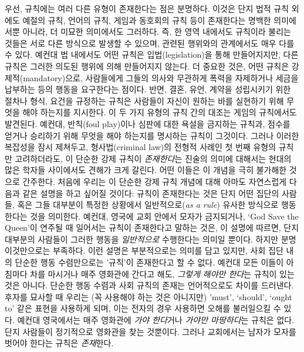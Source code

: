 \documentclass[12pt, oneside]{book}  %
\begin{document}
우선, 규칙에는 여러 다른 유형이 존재한다는 점은 분명하다. 이것은 단지
법적 규칙 외에도 예절의 규칙, 언어의 규칙, 게임과 동호회의 규칙 등이
존재한다는 명백한 의미에서뿐 아니라, 더 미묘한 의미에서도 그러하다. 즉,
한 영역 내에서도 규칙이라 불리는 것들은 서로 다른 방식으로 발생할 수
있으며, 관련된 행위와의 관계에서도 매우 다를 수 있다. 예컨대 법 내에서도
어떤 규칙은 입법(legislation)을 통해 만들어지지만, 다른 규칙은 그러한
의도된 행위에 의해 만들어지지 않는다. 더 중요한 것은, 어떤 규칙은
강제적(mandatory)으로, 사람들에게 그들의 의사와 무관하게 폭력을
자제하거나 세금을 납부하는 등의 행동을 요구한다는 점이다. 반면, 결혼,
유언, 계약을 성립시키기 위한 절차나 형식, 요건을 규정하는 규칙은
사람들이 자신이 원하는 바를 실현하기 위해 무엇을 해야 하는지를 지시한다.
이 두 가지 유형의 규칙 간의 대조는 게임의 규칙에서도 발견된다. 예컨대,
반칙(foul play)이나 심판에 대한 욕설을 금지하는 규칙과, 점수를 얻거나
승리하기 위해 무엇을 해야 하는지를 명시하는 규칙이 그것이다. 그러나
이러한 복잡성을 잠시 제쳐두고, 형사법(criminal law)의 전형적 사례인 첫
번째 유형의 규칙만 고려하더라도, 이 단순한 강제 규칙이 \emph{존재한다}는
진술의 의미에 대해서는 현대의 많은 학자들 사이에서도 견해가 크게 갈린다.
어떤 이들은 이 개념을 극히 불가해한 것으로 간주한다. 처음에 우리는 이
단순한 강제 규칙 개념에 대해 아마도 자연스럽게 다음과 같은 설명을 하고
싶어질 것이다: 규칙이 존재한다는 것은 단지 어떤 집단의 사람들, 혹은 그들
대부분이 특정한 상황에서 일반적으로(\emph{as a rule}) 유사한 방식으로
행동한다는 것을 의미한다. 예컨대, 영국에 교회 안에서 모자가 금지되거나,
`God Save the Queen'이 연주될 때 일어서는 규칙이 존재한다고 말하는 것은,
이 설명에 따르면, 단지 대부분의 사람들이 그러한 행동을 \emph{일반적으로}
수행한다는 의미일 뿐이다. 하지만 분명 이것만으로는 부족하다. 이런 설명은
부분적으로는 의미를 담고 있지만, 사회 집단 내의 단순한 행동 수렴만으로는
'규칙'이 존재한다고 할 수 없다. 예컨대 모든 이들이 아침마다 차를
마시거나 매주 영화관에 간다고 해도, \emph{그렇게 해야만 한다}는 규칙이
있는 것은 아니다. 단순한 행동 수렴과 사회 규칙의 존재는 언어적으로도
차이를 드러낸다. 후자를 묘사할 때 우리는 (꼭 사용해야 하는 것은
아니지만) 'must', `should', `ought to' 같은 표현을 사용하게 되며, 이는
전자의 경우 사용하면 오해를 불러일으킬 수 있다. 예컨대 영국에서는 매주
영화관에 \emph{가야 한다}거나 \emph{가야만 마땅하다}는 규칙은 없다. 단지
사람들이 정기적으로 영화관을 찾는 것뿐이다. 그러나 교회에서는 남자가
모자를 벗어야 한다는 규칙은 \emph{존재}한다.
\end{document}
